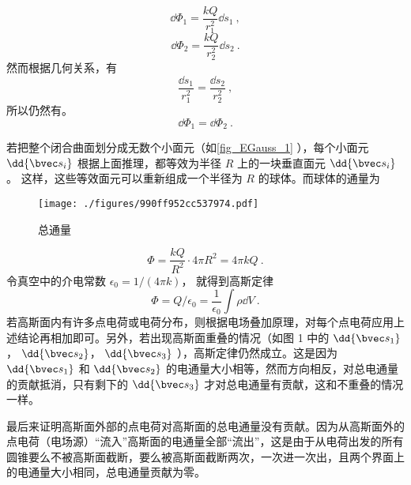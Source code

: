 \begin{equation}
\dd{\Phi_1} = \frac{kQ}{r_1^2} \dd{s_1}~,
\end{equation}
\begin{equation}
\dd{\Phi_2} = \frac{kQ}{r_2^2} \dd{s_2}~.
\end{equation}
然而根据几何关系，有
\begin{equation}
\frac{\dd{s_1}}{r_1^2} = \frac{\dd{s_2}}{r_2^2}~,
\end{equation} 
所以仍然有。
\begin{equation}
\dd{\Phi_1} = \dd{\Phi_2}~.
\end{equation} 

若把整个闭合曲面划分成无数个小面元（如\autoref{fig_EGauss_1} ），每个小面元 $\dd{\bvec s_i}$ 根据上面推理，都等效为半径 $R$ 上的一块垂直面元 $\dd{\bvec s_i}$。 这样，这些等效面元可以重新组成一个半径为 $R$ 的球体。而球体的通量为
\begin{figure}[ht]
\centering
\texttt{[image: ./figures/990ff952cc537974.pdf]}
\caption{总通量}\label{fig_EGauss_1}
\end{figure}

\begin{equation}
\Phi  = \frac{kQ}{R^2} \cdot 4\pi R^2 = 4\pi kQ~.
\end{equation} 
令真空中的介电常数 $\epsilon_0 = 1/(4\pi k)$， 就得到高斯定律
\begin{equation}
\Phi  = Q/\epsilon_0 = \frac{1}{\epsilon_0} \int \rho \dd{V}~.
\end{equation} 
若高斯面内有许多点电荷或电荷分布，则根据电场叠加原理，对每个点电荷应用上述结论再相加即可。另外，若出现高斯面重叠的情况（如图 1 中的 $\dd{\bvec s_1}$，  $\dd{\bvec s_2}$，  $\dd{\bvec s_3}$ ），高斯定律仍然成立。这是因为 $\dd{\bvec s_1}$ 和 $\dd{\bvec s_2}$ 的电通量大小相等，然而方向相反，对总电通量的贡献抵消，只有剩下的 $\dd{\bvec s_3}$ 才对总电通量有贡献，这和不重叠的情况一样。

最后来证明高斯面外部的点电荷对高斯面的总电通量没有贡献。因为从高斯面外的点电荷（电场源）“流入”高斯面的电通量全部“流出”，这是由于从电荷出发的所有圆锥要么不被高斯面截断，要么被高斯面截断两次，一次进一次出，且两个界面上的电通量大小相同，总电通量贡献为零。
 
